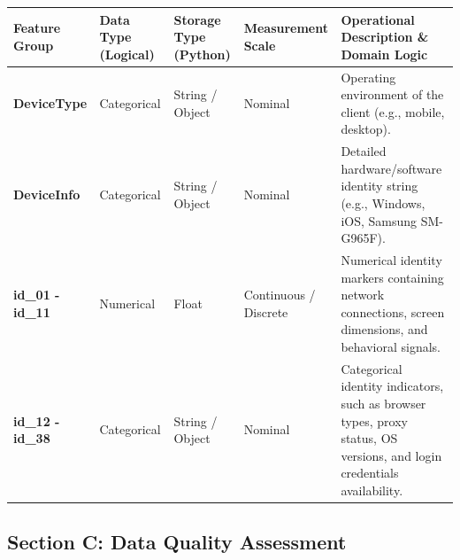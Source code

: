 \documentclass[11pt]{article}
\begin{document}
{\def\LTcaptype{none} %
\begin{longtable}[]{@{}
  >{\raggedright\arraybackslash}p{}
  >{\raggedright\arraybackslash}p{}
  >{\raggedright\arraybackslash}p{}
  >{\raggedright\arraybackslash}p{}
  >{\raggedright\arraybackslash}p{}@{}}
\toprule\noalign{}
\begin{minipage}[b]{\linewidth}\raggedright
Feature Group
\end{minipage} & \begin{minipage}[b]{\linewidth}\raggedright
Data Type (Logical)
\end{minipage} & \begin{minipage}[b]{\linewidth}\raggedright
Storage Type (Python)
\end{minipage} & \begin{minipage}[b]{\linewidth}\raggedright
Measurement Scale
\end{minipage} & \begin{minipage}[b]{\linewidth}\raggedright
Operational Description \& Domain Logic
\end{minipage} \\
\midrule\noalign{}
\endhead
\bottomrule\noalign{}
\endlastfoot
\textbf{DeviceType} & Categorical & String / Object & Nominal &
Operating environment of the client (e.g., mobile, desktop). \\
\textbf{DeviceInfo} & Categorical & String / Object & Nominal & Detailed
hardware/software identity string (e.g., Windows, iOS, Samsung
SM-G965F). \\
\textbf{id\_01 - id\_11} & Numerical & Float & Continuous / Discrete &
Numerical identity markers containing network connections, screen
dimensions, and behavioral signals. \\
\textbf{id\_12 - id\_38} & Categorical & String / Object & Nominal &
Categorical identity indicators, such as browser types, proxy status, OS
versions, and login credentials availability. \\
\end{longtable}
}

    \subsection{Section C: Data Quality
Assessment}\label{section-c-data-quality-assessment}
\end{document}
